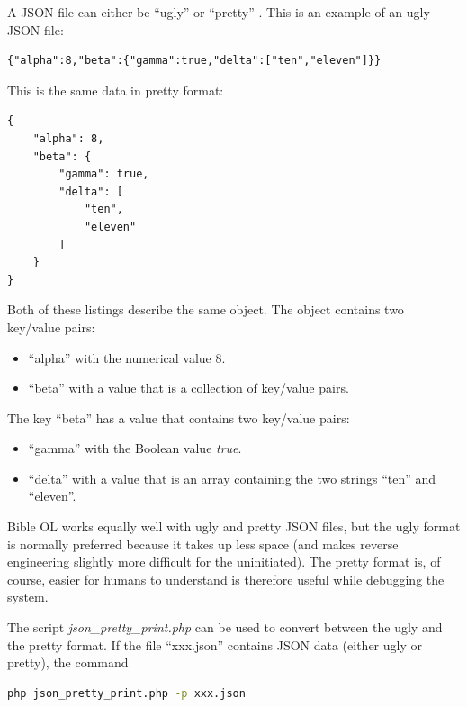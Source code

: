 \documentclass[11pt,oneside,a4paper]{memoir}
\begin{document}
A JSON file can either be ``ugly''%
or ``pretty''%
.
This is an example of an ugly JSON file:

\begin{lstlisting}
{"alpha":8,"beta":{"gamma":true,"delta":["ten","eleven"]}}
\end{lstlisting}

This is the same data in pretty format:

\begin{lstlisting}
{
    "alpha": 8,
    "beta": {
        "gamma": true,
        "delta": [
            "ten",
            "eleven"
        ]
    }
}
\end{lstlisting}

Both of these listings describe the same object. The object contains two key/value pairs:

\begin{itemize}
\item ``alpha'' with the numerical value 8.
\item ``beta'' with a value that is a collection of key/value pairs.
\end{itemize}

The key ``beta'' has a value that contains two key/value pairs:

\begin{itemize}
\item ``gamma'' with the Boolean value \emph{true}.
\item ``delta'' with a value that is an array containing the two strings ``ten'' and ``eleven''.
\end{itemize}


Bible OL works equally well with ugly and pretty JSON files, but the ugly format is normally
preferred because it takes up less space (and makes reverse engineering slightly more difficult for
the uninitiated). The pretty format is, of course, easier for humans to understand is therefore useful
while debugging the system.

The script \emph{json\_pretty\_print.php} can be used to convert
between the ugly and the pretty format. If the file
``xxx.json'' contains JSON data (either ugly or pretty), the command

\begin{lstlisting}[language=bash]
php json_pretty_print.php -p xxx.json
\end{lstlisting}
\end{document}
